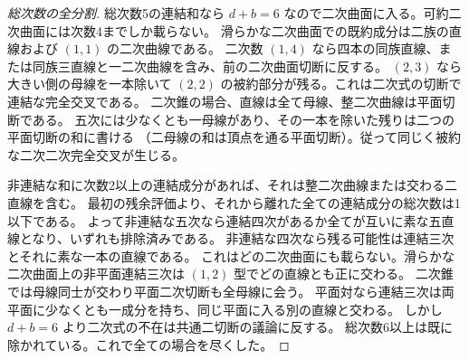 \begin{proof}[総次数の全分割]
総次数5の連結和なら $d+b=6$ なので二次曲面に入る。可約二次曲面には次数4までしか載らない。
滑らかな二次曲面での既約成分は二族の直線および $(1,1)$ の二次曲線である。
二次数 $(1,4)$ なら四本の同族直線、または同族三直線と一二次曲線を含み、前の二次曲面切断に反する。
$(2,3)$ なら大きい側の母線を一本除いて $(2,2)$ の被約部分が残る。これは二次式の切断で連結な完全交叉である。
二次錐の場合、直線は全て母線、整二次曲線は平面切断である。
五次には少なくとも一母線があり、その一本を除いた残りは二つの平面切断の和に書ける
（二母線の和は頂点を通る平面切断）。従って同じく被約な二次二次完全交叉が生じる。

非連結な和に次数2以上の連結成分があれば、それは整二次曲線または交わる二直線を含む。
最初の残余評価より、それから離れた全ての連結成分の総次数は1以下である。
よって非連結な五次なら連結四次があるか全てが互いに素な五直線となり、いずれも排除済みである。
非連結な四次なら残る可能性は連結三次とそれに素な一本の直線である。
これはどの二次曲面にも載らない。滑らかな二次曲面上の非平面連結三次は $(1,2)$ 型でどの直線とも正に交わる。
二次錐では母線同士が交わり平面二次切断も全母線に会う。
平面対なら連結三次は両平面に少なくとも一成分を持ち、同じ平面に入る別の直線と交わる。
しかし $d+b=6$ より二次式の不在は共通二切断の議論に反する。
総次数6以上は既に除かれている。これで全ての場合を尽くした。
\end{proof}
